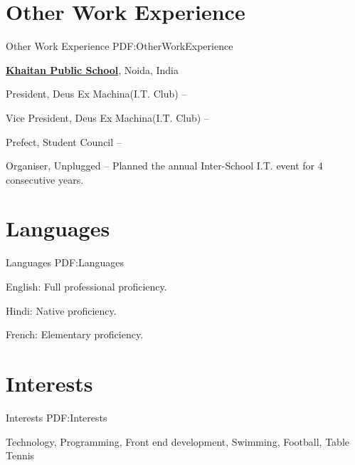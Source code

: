 \documentclass[letterpaper,10pt,oneside]{article}
\begin{document}
\begin{body}

\section
{Other Work\newline
Experience}
{Other Work Experience}
{PDF:OtherWorkExperience}

\href{http://www.thekhaitanschool.org}
{\textbf{Khaitan Public School}},
Noida, India

\GapNoBreak
\BulletItem
President,
Deus Ex Machina(I.T. Club)
\hfill
{} --

\GapNoBreak

\BulletItem
Vice President,
Deus Ex Machina(I.T. Club)
\hfill
{} --

\GapNoBreak

\BulletItem
Prefect,
Student Council
\hfill
{} --

\GapNoBreak

\BulletItem
Organiser,
Unplugged
\hfill
{} --
\GapNoBreak
\SubBulletItem
Planned the annual Inter-School I.T. event for 4 consecutive years.



\section
{Languages}
{Languages}
{PDF:Languages}

\BulletItem
English: Full professional proficiency.

\GapNoBreak
\BulletItem
Hindi: Native proficiency.

\GapNoBreak
\BulletItem
French: Elementary proficiency.


\section
{Interests}
{Interests}
{PDF:Interests}

Technology, Programming,
\newline
Front end development,
\newline
Swimming, Football, Table Tennis


\end{body}
\end{document}
